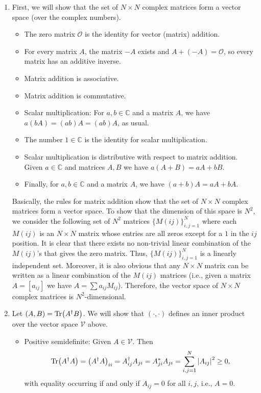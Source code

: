 \documentclass{article}
\theoremstyle{definition}
\newcommand{\lp}{\left(}
\newcommand{\rp}{\right)}
\begin{document}
\begin{enumerate}[label = (\alph*)]
	\item First, we will show that the set of $N\times N$ complex matrices form a vector space (over the complex numbers). 
	\begin{itemize}
		\item The zero matrix $\mathcal{O}$ is the identity for vector (matrix) addition. 
		\item For every matrix $A$, the matrix $-A$ exists and $A+(-A)=\mathcal{O}$, so every matrix has an additive inverse. 
		\item Matrix addition is associative.
		\item Matrix addition is commutative. 
		\item Scalar multiplication: For $a,b\in \mathbb{C}$ and a matrix $A$, we have $a(bA) = (ab)A = (ab)A$, as usual. 
		\item The number $1\in \mathbb{C}$ is the identity for scalar multiplication.
		\item Scalar multiplication is distributive with respect to matrix addition. Given $a\in \mathbb{C}$ and matrices $A,B$ we have $a(A+B) = aA + bB$. 
		\item Finally, for $a,b\in \mathbb{C}$ and a matrix $A$, we have $(a+b)A = aA + bA$. 
	\end{itemize}
	Basically, the rules for matrix addition show that the set of $N\times N$ complex matrices form a vector space. To show that the dimension of this space is $N^2$, we consider the following set of $N^2$ matrices $\{ M(ij)\}_{i,j = 1}^{N}$ where each $M(ij)$ is an $N\times N$ matrix whose entries are all zeros except for a $1$ in the $ij$ position.  It is clear that there exists no non-trivial linear combination of the $M(ij)$'s that gives the zero matrix. Thus, $\{M(ij)\}_{i,j=1}^N$ is a linearly independent set. Moreover, it is also obvious that any $N\times N$ matrix can be written as a linear combination of the $M(ij)$ matrices (i.e., given a matrix $A = [a_{ij}]$ we have $A = \sum a_{ij} M_{ij}$). Therefore, the vector space of $N\times N$ complex matrices is $N^2$-dimensional. 
	
	
	\item Let $(A,B) = \Tr(A^\dagger B)$. We will show that $(\cdot , \cdot)$ defines an inner product over the vector space $\mathcal{V}$ above. 
	\begin{itemize}
		\item Positive semidefinite: Given $A\in \mathcal{V}$. Then 
		\begin{align*}
		\Tr(A^\dagger A) = \lp A^\dagger A \rp_{ii} = A^\dagger_{ij}A_{ji} = A^*_{ji}A_{ji} = \sum_{i,j=1}^N \abs{A_{ij}}^2 \geq 0,
		\end{align*}
		with equality occurring if and only if $A_{ij} = 0$ for all $i,j$, i.e., $A = 0$. 
		

\end{itemize}
\end{enumerate}
\end{document}
